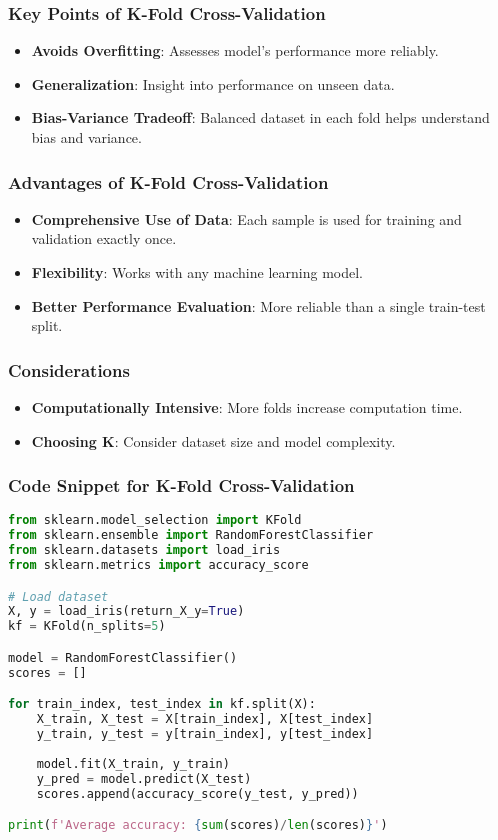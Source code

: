 \documentclass[aspectratio=169]{beamer}
\begin{document}
\begin{frame}[fragile]
    \frametitle{Key Points of K-Fold Cross-Validation}
    \begin{itemize}
        \item \textbf{Avoids Overfitting}: Assesses model's performance more reliably.
        \item \textbf{Generalization}: Insight into performance on unseen data.
        \item \textbf{Bias-Variance Tradeoff}: Balanced dataset in each fold helps understand bias and variance.
    \end{itemize}
\end{frame}

\begin{frame}[fragile]
    \frametitle{Advantages of K-Fold Cross-Validation}
    \begin{itemize}
        \item \textbf{Comprehensive Use of Data}: Each sample is used for training and validation exactly once.
        \item \textbf{Flexibility}: Works with any machine learning model.
        \item \textbf{Better Performance Evaluation}: More reliable than a single train-test split.
    \end{itemize}
\end{frame}

\begin{frame}[fragile]
    \frametitle{Considerations}
    \begin{itemize}
        \item \textbf{Computationally Intensive}: More folds increase computation time.
        \item \textbf{Choosing K}: Consider dataset size and model complexity.
    \end{itemize}
\end{frame}

\begin{frame}[fragile]
    \frametitle{Code Snippet for K-Fold Cross-Validation}
    \begin{lstlisting}[language=Python]
from sklearn.model_selection import KFold
from sklearn.ensemble import RandomForestClassifier
from sklearn.datasets import load_iris
from sklearn.metrics import accuracy_score

# Load dataset
X, y = load_iris(return_X_y=True)
kf = KFold(n_splits=5)

model = RandomForestClassifier()
scores = []

for train_index, test_index in kf.split(X):
    X_train, X_test = X[train_index], X[test_index]
    y_train, y_test = y[train_index], y[test_index]
    
    model.fit(X_train, y_train)
    y_pred = model.predict(X_test)
    scores.append(accuracy_score(y_test, y_pred))

print(f'Average accuracy: {sum(scores)/len(scores)}')
    \end{lstlisting}
\end{frame}
\end{document}
